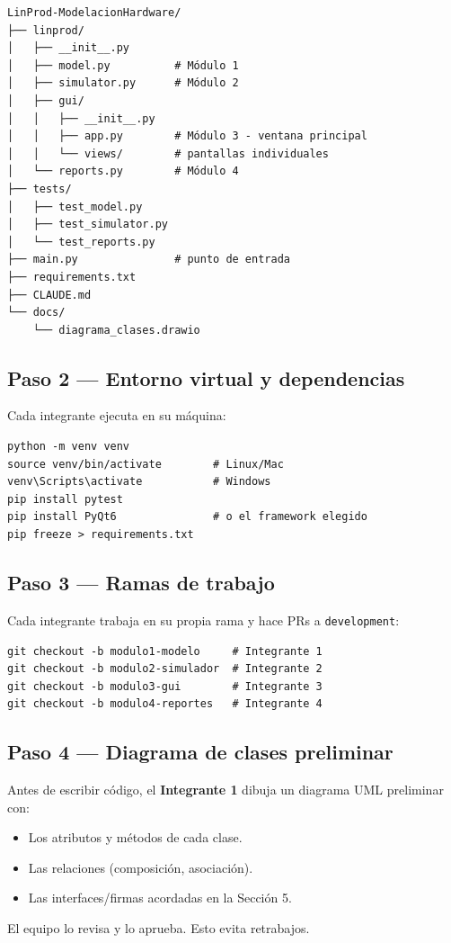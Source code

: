 \documentclass[12pt,letterpaper]{article}
\begin{document}
\begin{verbatim}
LinProd-ModelacionHardware/
├── linprod/
│   ├── __init__.py
│   ├── model.py          # Módulo 1
│   ├── simulator.py      # Módulo 2
│   ├── gui/
│   │   ├── __init__.py
│   │   ├── app.py        # Módulo 3 - ventana principal
│   │   └── views/        # pantallas individuales
│   └── reports.py        # Módulo 4
├── tests/
│   ├── test_model.py
│   ├── test_simulator.py
│   └── test_reports.py
├── main.py               # punto de entrada
├── requirements.txt
├── CLAUDE.md
└── docs/
    └── diagrama_clases.drawio
\end{verbatim}

\subsection*{Paso 2 --- Entorno virtual y dependencias}

Cada integrante ejecuta en su máquina:
\begin{verbatim}
python -m venv venv
source venv/bin/activate        # Linux/Mac
venv\Scripts\activate           # Windows
pip install pytest
pip install PyQt6               # o el framework elegido
pip freeze > requirements.txt
\end{verbatim}

\subsection*{Paso 3 --- Ramas de trabajo}

Cada integrante trabaja en su propia rama y hace PRs a \texttt{development}:
\begin{verbatim}
git checkout -b modulo1-modelo     # Integrante 1
git checkout -b modulo2-simulador  # Integrante 2
git checkout -b modulo3-gui        # Integrante 3
git checkout -b modulo4-reportes   # Integrante 4
\end{verbatim}

\subsection*{Paso 4 --- Diagrama de clases preliminar}

Antes de escribir código, el \textbf{Integrante 1} dibuja un diagrama UML preliminar con:
\begin{itemize}[leftmargin=2em]
    \item Los atributos y métodos de cada clase.
    \item Las relaciones (composición, asociación).
    \item Las interfaces/firmas acordadas en la Sección 5.
\end{itemize}
El equipo lo revisa y lo aprueba. Esto evita retrabajos.
\end{document}
